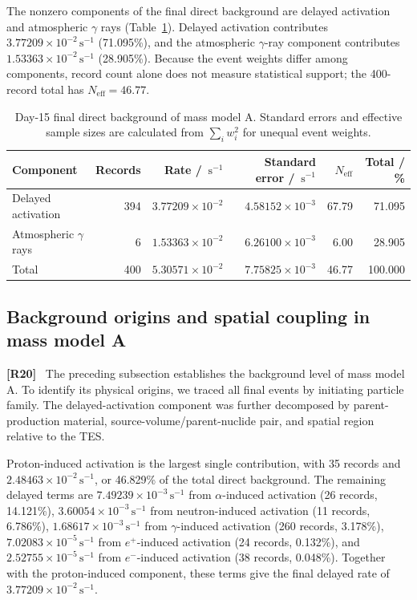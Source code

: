 \documentclass[11pt]{article}
\newcommand{\revmark}[1]{\textcolor{revisionblue}{\textbf{[R#1]}}\ }
\newcommand{\revblue}[1]{\textcolor{revisionblue}{#1}}
\newcommand{\cps}{\ensuremath{\,\mathrm{s^{-1}}}}
\begin{document}
The nonzero components of the final direct background are delayed activation
and \revblue{atmospheric $\gamma$ rays}
(Table~\ref{tab:reference_background_budget}). Delayed activation contributes
$3.77209\times10^{-2}\cps$ (71.095\%), and the \revblue{atmospheric $\gamma$-ray component} contributes
$1.53363\times10^{-2}\cps$ (28.905\%). Because the event weights differ among
components, record count alone does not measure statistical support; the
400-record total has $N_{\mathrm{eff}}=46.77$.

\begin{table}[H]
\centering
\caption{Day-15 final direct background of mass model A. Standard errors and effective sample sizes are calculated from $\sum_i w_i^2$ for unequal event weights.}
\label{tab:reference_background_budget}
\footnotesize
\begin{tabular}{lrrrrr}
\toprule
Component & Records & Rate / $\cps$ & Standard error / $\cps$ & $N_{\mathrm{eff}}$ & Total / \% \\
\midrule
Delayed activation & 394 & $3.77209\times10^{-2}$ & $4.58152\times10^{-3}$ & 67.79 & 71.095 \\
\revblue{Atmospheric $\gamma$ rays} & 6 & $1.53363\times10^{-2}$ & $6.26100\times10^{-3}$ & 6.00 & 28.905 \\
\midrule
Total & 400 & $5.30571\times10^{-2}$ & $7.75825\times10^{-3}$ & 46.77 & 100.000 \\
\bottomrule
\end{tabular}
\end{table}

\subsection{Background origins and spatial coupling in mass model A}
\label{subsec:mass_model_a_origins}

\revmark{20}
\begingroup
\color{revisionblue}
The preceding subsection establishes the background level of mass model A. To identify its physical origins, we traced all final events by initiating particle family. The delayed-activation component was further decomposed by parent-production material, source-volume/parent-nuclide pair, and spatial region relative to the TES.

Proton-induced activation is the largest single contribution, with 35 records and $2.48463\times10^{-2}\cps$, or 46.829\% of the total direct background. The remaining delayed terms are $7.49239\times10^{-3}\cps$ from $\alpha$-induced activation (26 records, 14.121\%), $3.60054\times10^{-3}\cps$ from neutron-induced activation (11 records, 6.786\%), $1.68617\times10^{-3}\cps$ from $\gamma$-induced activation (260 records, 3.178\%), $7.02083\times10^{-5}\cps$ from $e^+$-induced activation (24 records, 0.132\%), and $2.52755\times10^{-5}\cps$ from $e^-$-induced activation (38 records, 0.048\%). Together with the proton-induced component, these terms give the final delayed rate of $3.77209\times10^{-2}\cps$.
\end{document}
